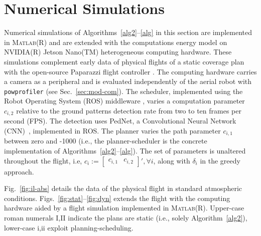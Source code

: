 \documentclass[letterpaper,10pt,conference,twoside]{IEEEtran}
\newcommand{\stt}[1]{{\small\tt #1}} %
\newcommand{\powprof}{\stt{powprofiler}}
\theoremstyle{definition}
\begin{document}
\section{Numerical Simulations} %
\label{sec:experimental}        %
\vspace*{-.2ex}

Numerical simulations of Algorithms~\ref{alg2}--\ref{alg} in this section are implemented in \textsc{Matlab}\hspace{.5ex}(R) and are extended with the computations energy model on NVIDIA\hspace{.5ex}(R) Jetson Nano\hspace{.5ex}(TM) heterogeneous computing hardware. These simulations complement early data of physical flights of a static coverage plan with the open-source Paparazzi flight controller%
.
The computing hardware carries a camera as a peripheral and is evaluated independently of the aerial robot with \powprof{} (see Sec.~\ref{sec:mod-com}). The scheduler, implemented using the Robot Operating System (ROS) middleware%
, varies a computation parameter $c_{i,2}$ relative to the ground patterns detection rate from two to ten frames per second (FPS). The detection uses PedNet, a Convolutional Neural Network (CNN)~\cite{ullah2018pednet}, %
implemented in ROS. The planner varies the path parameter $c_{i,1}$ %
between zero and -1000 (i.e., the planner-scheduler is the concrete implementation of Algorithms~\ref{alg2}--\ref{alg}). The set of parameters is unaltered 
through{\color{black}out} the flight, i.e, $c_i:=\begin{bmatrix}c_{i,1}&c_{i,2}\end{bmatrix}',\forall i${\color{black}, along with $\delta_i$ %
in the greedy approach}. 

Fig.~\ref{fig:il-abs} details the data of the physical flight  
in standard atmospheric conditions. 
Fig{\color{black}s}.~\ref{fig:stat}{\color{black}--\ref{fig:dyn}} extends the flight with the computing hardware aided by a flight simulation implemented in \textsc{Matlab}\hspace{.5ex}(R). 
Upper-case roman numerals I,II indicate the plans are static (i.e., solely Algorithm~\ref{alg2}), lower-case i,ii exploit planning-scheduling. %
\end{document}
